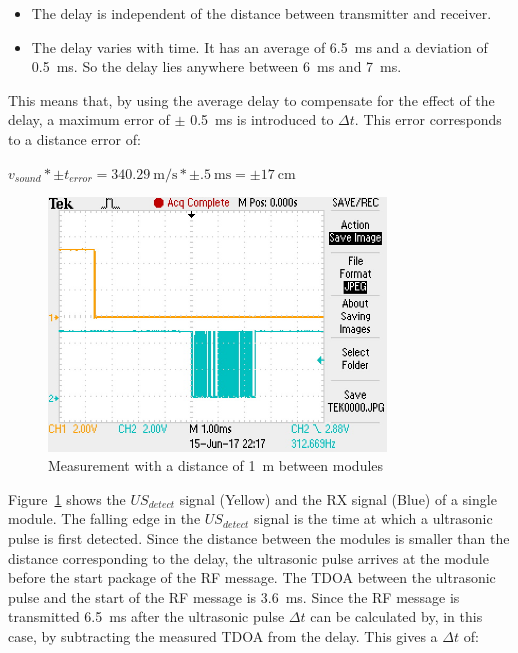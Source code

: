 \begin{itemize}
\item
The delay is independent of the distance between transmitter and receiver.
\item
The delay varies with time.
It has an average of \SI{6.5}{\milli\second} and a deviation of \SI{0.5}{\milli\second}.
So the delay lies anywhere between \SI{6}{\milli\second} and \SI{7}{\milli\second}.
\end{itemize}

This means that, by using the average delay to compensate for the effect of the delay, a maximum error of $\pm$ \SI{0.5}{\milli\second} is introduced to $\Delta t$.
This error corresponds to a distance error of:

$ v_{sound} * \pm t_{error} = \SI{340.29}{\meter\per\second} * \pm \SI{.5}{\milli\second} =\pm \SI{17}{\centi\meter} $


\begin{figure}[H]
\centering
\includegraphics[width=0.8\textwidth]{Figures/test_1m.JPG}
\caption{Measurement with a distance of \SI{1}{\meter} between modules}
\label{fig:mes_1}
\end{figure}

Figure~\ref{fig:mes_1} shows the $US_{detect}$ signal (Yellow) and the RX signal (Blue) of a single module.
The falling edge in the $US_{detect}$ signal is the time at which a ultrasonic pulse is first detected.
Since the distance between the modules is smaller than the distance corresponding to the delay, the ultrasonic pulse arrives at the module before the start package of the RF message.
The TDOA between the ultrasonic pulse and the start of the RF message is \SI{3.6}{\milli\second}.
Since the RF message is transmitted \SI{6.5}{\milli\second} after the ultrasonic pulse $\Delta t$ can be calculated by, in this case, by subtracting the measured TDOA from the delay.
This gives a $\Delta t$ of:

